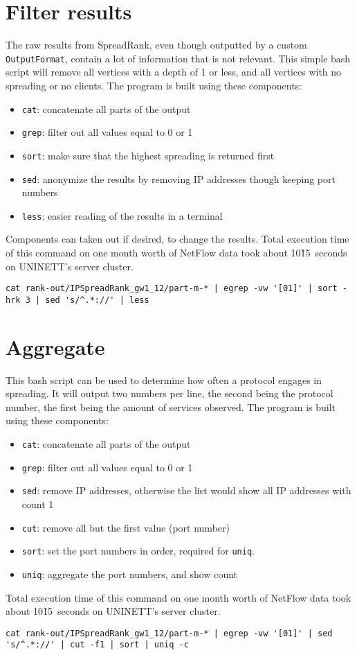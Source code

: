 \begin{landscape}
\newpage
\section{Filter results}
The raw results from SpreadRank, even though outputted by a custom \verb"OutputFormat", contain a lot of information that is not relevant.
This simple \gls{bash} script will remove all vertices with a \gls{depth} of 1 or less, and all vertices with no spreading or no clients.
The program is built using these components:
\begin{itemize}[label={$\bullet$}]
\item \verb"cat": concatenate all parts of the output
\item \verb"grep": filter out all values equal to 0 or 1
\item \verb"sort": make sure that the highest spreading is returned first
\item \verb"sed": anonymize the results by removing IP addresses though keeping port numbers
\item \verb"less": easier reading of the results in a terminal
\end{itemize}
Components can taken out if desired, to change the results.
Total execution time of this command on one month worth of NetFlow data took about 10\~15~seconds on UNINETT's server cluster.

\begin{verbatim}
cat rank-out/IPSpreadRank_gw1_12/part-m-* | egrep -vw '[01]' | sort -hrk 3 | sed 's/^.*://' | less
\end{verbatim}

\newpage
\section{Aggregate}
This \gls{bash} script can be used to determine how often a protocol engages in spreading.
It will output two numbers per line, the second being the protocol number, the first being the amount of services observed.
The program is built using these components:
\begin{itemize}[label={$\bullet$}]
\item \verb"cat": concatenate all parts of the output
\item \verb"grep": filter out all values equal to 0 or 1
\item \verb"sed": remove IP addresses, otherwise the list would show all IP addresses with count 1
\item \verb"cut": remove all but the first value (port number)
\item \verb"sort": set the port numbers in order, required for \verb"uniq".
\item \verb"uniq": aggregate the port numbers, and show count
\end{itemize}
Total execution time of this command on one month worth of NetFlow data took about 10\~15~seconds on UNINETT's server cluster.

\begin{verbatim}
cat rank-out/IPSpreadRank_gw1_12/part-m-* | egrep -vw '[01]' | sed 's/^.*://' | cut -f1 | sort | uniq -c
\end{verbatim}

\end{landscape}
